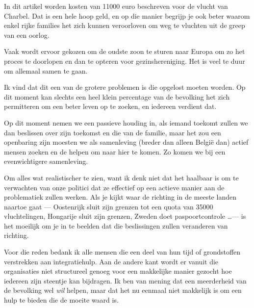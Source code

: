 \documentclass[12pt, a4paper]{paper}
\begin{document}
In dit artikel worden kosten van 11000 euro beschreven voor de vlucht van Charbel. Dat is een hele hoop geld, en op die manier begrijp je ook beter waarom enkel rijke families het zich kunnen veroorloven om weg te vluchten uit de greep van een oorlog.

Vaak wordt ervoor gekozen om de oudste zoon te sturen naar Europa om zo het proces te doorlopen en dan te opteren voor gezinshereniging. Het is veel te duur om allemaal samen te gaan.

Ik vind dat dit een van de grotere problemen is die opgelost moeten worden. Op dit moment kan slechts een heel klein percentage van de bevolking het zich permitteren om een beter leven op te zoeken, en iedereen verdient dat.

Op dit moment nemen we een passieve houding in, als iemand toekomt zullen we dan beslissen over zijn toekomst en die van de familie, maar het zou een openbaring zijn moesten we als samenleving (breder dan alleen België dan) actief mensen zoeken en de helpen om naar hier te komen. Zo komen we bij een evenwichtigere samenleving.

Om alles wat realistischer te zien, want ik denk niet dat het haalbaar is om te verwachten van onze politici dat ze effectief op een actieve manier aan de problematiek zullen werken. Als je kijkt waar de richting in de meeste landen naartoe gaat --- Oostenrijk sluit zijn grenzen tot een quota van 35000 vluchtelingen, Hongarije sluit zijn grenzen, Zweden doet paspoortcontrole \dots --- is het moeilijk om je in te beelden dat die beslissingen zullen veranderen van richting.

Voor die reden bedank ik alle mensen die een deel van hun tijd of grondstoffen verstrekken aan integratiehulp. Aan de andere kant wordt er vanuit die organisaties niet structureel genoeg voor een makkelijke manier gezocht hoe iedereen zijn steentje kan bijdragen. Ik ben van mening dat een meerderheid van de bevolking wel \emph{wil} helpen, maar dat het nu eenmaal niet makkelijk is om een hulp te bieden die de moeite waard is.

\end{document}
